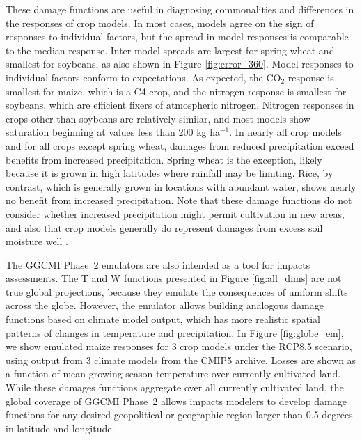 \documentclass[gmdd]{copernicus} %
\begin{document}
These damage functions are useful in diagnosing commonalities and differences in the responses of crop models. 
In most cases, models agree on the sign of responses to individual factors, but the spread in model responses is comparable to the median response. Inter-model spreads are largest for spring wheat and smallest for soybeans, as also shown in Figure \ref{fig:error_360}.
Model responses to individual factors conform to expectations. As expected, the CO$_2$ response is smallest for maize, which is a C4 crop, and the nitrogen response is smallest for soybeans, which are efficient fixers of atmospheric nitrogen. Nitrogen responses in crops other than soybeans are relatively similar, and most models show saturation beginning at values less than 200 kg ha$^{-1}$.
In nearly all crop models and for all crops except spring wheat, damages from reduced precipitation exceed benefits from increased precipitation. Spring wheat is the exception, likely because it is grown in high latitudes where rainfall may be limiting. Rice, by contrast, which is generally grown in locations with abundant water, shows nearly no benefit from increased precipitation.
Note that these damage functions do not consider whether increased precipitation might permit cultivation in new areas, and also that crop models generally do represent damages from excess soil moisture well \citep{Li2019}.

The GGCMI Phase~2 emulators are also intended as a tool for impacts assessments.
The T and W functions presented in Figure \ref{fig:all_dims} are not true global projections, because they emulate the consequences of uniform shifts across the globe.
However, the emulator allows building analogous damage functions based on climate model output, which has more realistic spatial patterns of changes in temperature and precipitation. 
In Figure \ref{fig:globe_em}, we show emulated maize responses for 3 crop models under the RCP8.5 scenario, using output from 3 climate models from the CMIP5 archive. 
Losses are shown as a function of mean growing-season temperature over currently cultivated land. While these damages functions aggregate over all currently cultivated land, the global coverage of GGCMI Phase~2 allows impacts modelers to develop damage functions for any desired geopolitical or geographic region larger than 0.5 degrees in latitude and longitude. 
\end{document}
